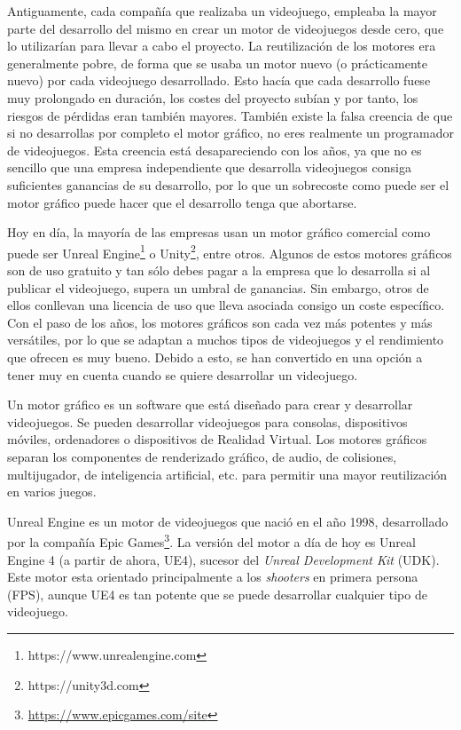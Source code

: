 Antiguamente, cada compañía que realizaba un videojuego, empleaba la mayor parte del desarrollo del mismo en crear un motor de videojuegos desde cero, que lo utilizarían para llevar a cabo el proyecto. La reutilización de los motores era generalmente pobre, de forma que se usaba un motor nuevo (o prácticamente nuevo) por cada videojuego desarrollado. Esto hacía que cada desarrollo fuese muy prolongado en duración, los costes del proyecto subían y por tanto, los riesgos de pérdidas eran también mayores. También existe la falsa creencia de que si no desarrollas por completo el motor gráfico, no eres realmente un programador de videojuegos. Esta creencia está desapareciendo con los años, ya que no es sencillo que una empresa independiente que desarrolla videojuegos consiga suficientes ganancias de su desarrollo, por lo que un sobrecoste como puede ser el motor gráfico puede hacer que el desarrollo tenga que abortarse.

\pagestyle{notsection}

Hoy en día, la mayoría de las empresas usan un motor gráfico comercial como puede ser Unreal Engine\footnote{https://www.unrealengine.com} o Unity\footnote{https://unity3d.com}, entre otros. Algunos de estos motores gráficos son de uso gratuito y tan sólo debes pagar a la empresa que lo desarrolla si al publicar el videojuego, supera un umbral de ganancias. Sin embargo, otros de ellos conllevan una licencia de uso que lleva asociada consigo un coste específico. Con el paso de los años, los motores gráficos son cada vez más potentes y más versátiles, por lo que se adaptan a muchos tipos de videojuegos y el rendimiento que ofrecen es muy bueno. Debido a esto, se han convertido en una opción a tener muy en cuenta cuando se quiere desarrollar un videojuego. 

Un motor gráfico \cite{5} es un software que está diseñado para crear y desarrollar videojuegos. Se pueden desarrollar videojuegos para consolas, dispositivos móviles, ordenadores o dispositivos de Realidad Virtual. Los motores gráficos separan los componentes de renderizado gráfico, de audio, de colisiones, multijugador, de inteligencia artificial, etc. para permitir una mayor reutilización en varios juegos.

Unreal Engine es un motor de videojuegos que nació en el año 1998, desarrollado por la compañía Epic Games\footnote{\url{https://www.epicgames.com/site}}. La versión del motor a día de hoy es Unreal Engine 4 (a partir de ahora, UE4), sucesor del \textit{Unreal Development Kit} (UDK). Este motor esta orientado principalmente a los \textit{shooters} en primera persona (FPS), aunque UE4 es tan potente que se puede desarrollar cualquier tipo de videojuego.

